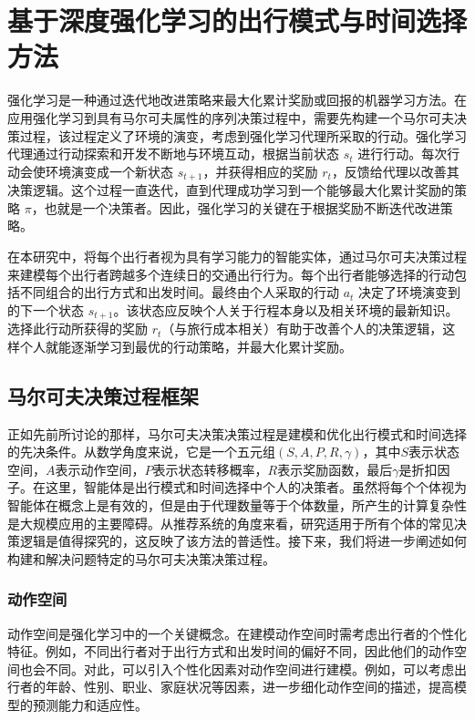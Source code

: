 \chapter{基于深度强化学习的出行模式与时间选择方法}
\label{chp:float}

强化学习是一种通过迭代地改进策略来最大化累计奖励或回报的机器学习方法。在应用强化学习到具有马尔可夫属性的序列决策过程中，需要先构建一个马尔可夫决策过程，该过程定义了环境的演变，考虑到强化学习代理所采取的行动。强化学习代理通过行动探索和开发不断地与环境互动，根据当前状态 $s_t$ 进行行动。每次行动会使环境演变成一个新状态 $s_{t+1}$，并获得相应的奖励 $r_t$，反馈给代理以改善其决策逻辑。这个过程一直迭代，直到代理成功学习到一个能够最大化累计奖励的策略 $\pi$，也就是一个决策者。因此，强化学习的关键在于根据奖励不断迭代改进策略。

在本研究中，将每个出行者视为具有学习能力的智能实体，通过马尔可夫决策过程来建模每个出行者跨越多个连续日的交通出行行为。每个出行者能够选择的行动包括不同组合的出行方式和出发时间。最终由个人采取的行动 $a_t$ 决定了环境演变到的下一个状态 $s_{t+1}$。该状态应反映个人关于行程本身以及相关环境的最新知识。选择此行动所获得的奖励 $r_t$（与旅行成本相关）有助于改善个人的决策逻辑，这样个人就能逐渐学习到最优的行动策略，并最大化累计奖励。
\section{马尔可夫决策过程框架}
正如先前所讨论的那样，马尔可夫决策决策过程是建模和优化出行模式和时间选择的先决条件。从数学角度来说，它是一个五元组$(S, A, P, R, \gamma)$，其中$S$表示状态空间，$A$表示动作空间，$P$表示状态转移概率，$R$表示奖励函数，最后$\gamma$是折扣因子。在这里，智能体是出行模式和时间选择中个人的决策者。虽然将每个个体视为智能体在概念上是有效的，但是由于代理数量等于个体数量，所产生的计算复杂性是大规模应用的主要障碍。从推荐系统的角度来看，研究适用于所有个体的常见决策逻辑是值得探究的，这反映了该方法的普适性。接下来，我们将进一步阐述如何构建和解决问题特定的马尔可夫决策决策过程。

\subsection{动作空间}

动作空间是强化学习中的一个关键概念。在建模动作空间时需考虑出行者的个性化特征。例如，不同出行者对于出行方式和出发时间的偏好不同，因此他们的动作空间也会不同。对此，可以引入个性化因素对动作空间进行建模。例如，可以考虑出行者的年龄、性别、职业、家庭状况等因素，进一步细化动作空间的描述，提高模型的预测能力和适应性。

